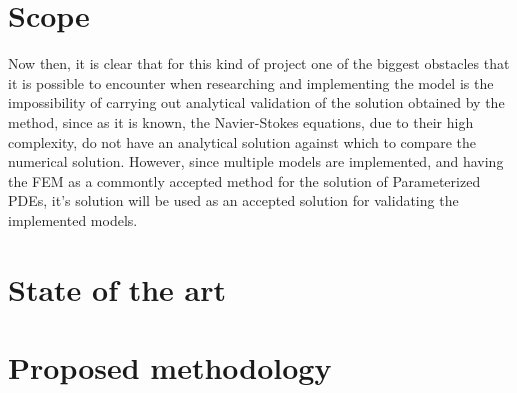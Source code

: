 \documentclass[12pt,letterpaper]{article}
\begin{document}
\section{Scope}

Now then, it is clear that for this kind of project one of the biggest obstacles that it is possible
to encounter when researching and implementing the model is the impossibility of carrying out
analytical validation of the solution obtained by the method, since as it is known, the Navier-Stokes
equations, due to their high complexity, do not have an analytical solution against which to compare
the numerical solution. However, since multiple models are implemented, and having the FEM as a commontly
accepted method for the solution of Parameterized PDEs, it's solution will be used as an accepted solution 
for validating the implemented models. 

\section{State of the art}

\section{Proposed methodology}

\end{document}
